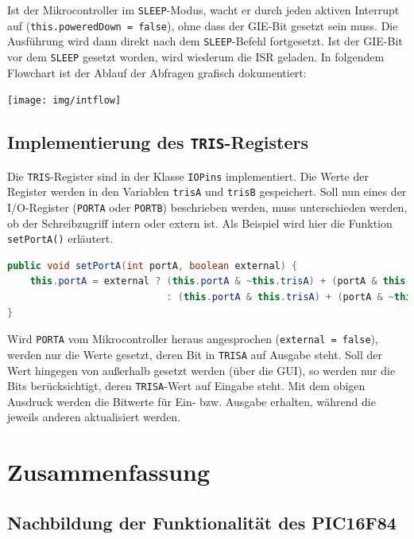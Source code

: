 \documentclass[a4paper]{article}
\begin{document}
Ist der Mikrocontroller im \texttt{SLEEP}-Modus, wacht er durch jeden aktiven Interrupt auf (\texttt{this.poweredDown = false}), ohne dass der GIE-Bit gesetzt sein muss.
Die Ausführung wird dann direkt nach dem \texttt{SLEEP}-Befehl fortgesetzt.
Ist der GIE-Bit vor dem \texttt{SLEEP} gesetzt worden, wird wiederum die ISR geladen.
In folgendem Flowchart ist der Ablauf der Abfragen grafisch dokumentiert:

\begin{center}
    \texttt{[image: img/intflow]}
\end{center}

\subsection{Implementierung des \texttt{TRIS}-Registers}

Die \texttt{TRIS}-Register sind in der Klasse \texttt{IOPins} implementiert.
Die Werte der Register werden in den Variablen \texttt{trisA} und \texttt{trisB} gespeichert.
Soll nun eines der I/O-Register (\texttt{PORTA} oder \texttt{PORTB}) beschrieben werden, muss unterschieden werden, ob der Schreibzugriff intern oder extern ist.
Als Beispiel wird hier die Funktion \texttt{setPortA()} erläutert.

\begin{lstlisting}[language=Java,basicstyle=\ttfamily,columns=fullflexible]
public void setPortA(int portA, boolean external) {
    this.portA = external ? (this.portA & ~this.trisA) + (portA & this.trisA)
                            : (this.portA & this.trisA) + (portA & ~this.trisA);
}
\end{lstlisting}

Wird \texttt{PORTA} vom Mikrocontroller heraus angesprochen (\texttt{external = false}), werden nur die Werte gesetzt, deren Bit in \texttt{TRISA} auf Ausgabe steht.
Soll der Wert hingegen von außerhalb gesetzt werden (über die GUI), so werden nur die Bits berücksichtigt, deren \texttt{TRISA}-Wert auf Eingabe steht.
Mit dem obigen Ausdruck werden die Bitwerte für Ein- bzw. Ausgabe erhalten, während die jeweils anderen aktualisiert werden.

\section{Zusammenfassung}

\subsection{Nachbildung der Funktionalität des PIC16F84}
\end{document}

